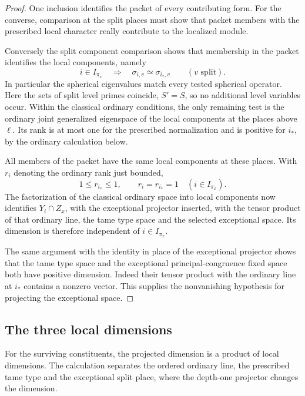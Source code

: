 \begin{proof}
One inclusion identifies the packet of every contributing form. For the converse, comparison at the split places must show that packet members with the prescribed local character really contribute to the localized module.

Conversely the split component comparison shows that membership in the packet identifies the local components, namely
\[
 i\in I_{\pi_x}\quad\Longrightarrow\quad \sigma_{i,v}\simeq\sigma_{i_*,v}\qquad(v\text{ split}).
\] In particular the spherical
eigenvalues match every tested spherical operator.
Here the sets of split level primes coincide, \(S'=S\), so no additional level variables occur. Within the classical
ordinary conditions, the only remaining test is
the ordinary joint generalized eigenspace of the
local components at the places above \(\ell\).
Its rank is at most one for the prescribed
normalization and is positive for \(i_*\), by the
ordinary calculation below.

All members of the packet have the same local components at these places. With \(r_i\) denoting the ordinary rank just bounded,
\[
 1\le r_{i_*}\le1,\qquad r_i=r_{i_*}=1\quad(i\in I_{\pi_x}).
\]
The factorization of the classical ordinary
space into local components now identifies
\(Y_i\cap Z_x\), with the exceptional projector
inserted, with the tensor product of that
ordinary line, the tame type space and the
selected exceptional space. Its dimension is
therefore independent of \(i\in I_{\pi_x}\).

The same argument with the identity in place
of the exceptional projector shows that the
tame type space and the exceptional
principal-congruence fixed space both have
positive dimension. Indeed their tensor
product with the ordinary line at \(i_*\)
contains a nonzero vector. This supplies the
nonvanishing hypothesis for projecting the
exceptional space.

\end{proof}

\subsection{The three local dimensions}

For the surviving constituents, the projected dimension is a product of local dimensions. The calculation separates the ordered ordinary line, the prescribed tame type and the exceptional split place, where the depth-one projector changes the dimension.

